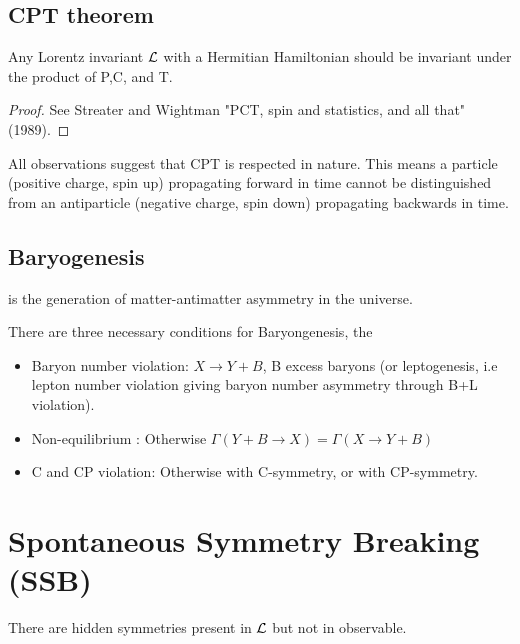 \documentclass{article}
\begin{document}
\subsection{CPT theorem}

\begin{theorem}
Any Lorentz invariant $\mathcal{L}$ with a Hermitian Hamiltonian should be invariant under the product of P,C, and T. 
\end{theorem}
\begin{proof}
See Streater and Wightman "PCT, spin and statistics, and all that" (1989).
\end{proof}
All observations suggest that CPT is respected in nature. This means 
 a particle (positive charge, spin up) propagating forward in time cannot be distinguished from an antiparticle (negative charge, spin down) propagating backwards in time. 
 
 \subsection{Baryogenesis}

\begin{definition}[Baryogenesis]
 is the generation of matter-antimatter asymmetry in the universe. 
\end{definition}

There are three necessary conditions for Baryongenesis, the 
\begin{itemize}
    \item Baryon number violation: $X \to Y+B$, B excess baryons (or leptogenesis, i.e lepton number violation giving baryon number asymmetry through B+L violation). 
    \item Non-equilibrium : Otherwise $\Gamma(Y+B \to X) = \Gamma(X \to Y+B)$
    \item C and CP violation: Otherwise  
    with C-symmetry, or 
    with CP-symmetry.
\end{itemize}

\section{Spontaneous Symmetry Breaking (SSB)}
There are hidden symmetries present in $\mathcal{L}$ but not in observable. 
\end{document}

